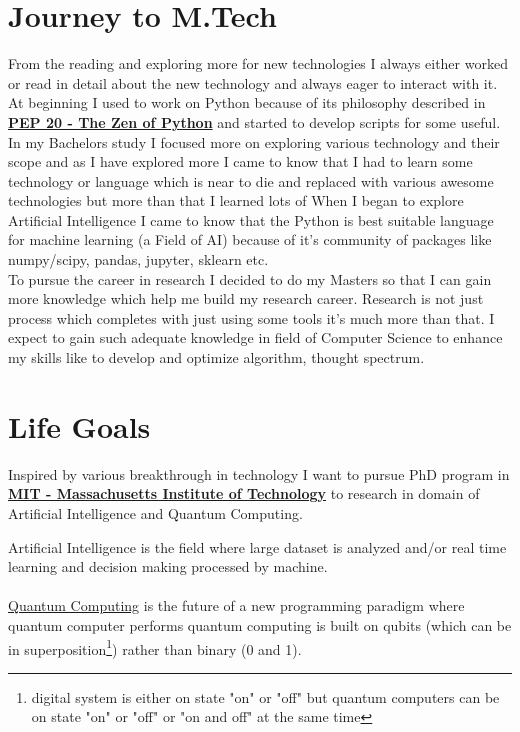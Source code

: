 \documentclass[a4paper, 14pt]{article}
\begin{document}
	\newpage
	\section*{Journey to M.Tech}
	From the reading and exploring more for new technologies I always either worked or read in detail about the new technology and always eager to interact with it. \\

	At beginning I used to work on Python because of its philosophy described in \href{https://www.python.org/dev/peps/pep-0020/#the-zen-of-python}{\textbf{PEP 20 -  The Zen of Python}} and started to develop scripts for some useful. \\
	In my Bachelors study I focused more on exploring various technology and their scope and as I have explored more I came to know that I had to learn some technology or language which is near to die and replaced with various awesome technologies but more than that I learned lots of 
	When I began to explore Artificial Intelligence I came to know that the Python is best suitable language for machine learning (a Field of AI) because of it's community of packages like numpy/scipy, pandas, jupyter, sklearn etc. \\
	
	To pursue the career in research I decided to do my Masters so that I can gain more knowledge which help me build my research career. Research is not just  process which completes with just using some tools it's much more than that. I expect to gain such adequate knowledge in field of Computer Science to enhance my skills like to develop and optimize algorithm, thought spectrum.

	\section*{Life Goals}
	Inspired by various breakthrough in technology I want to pursue PhD program in  \href{http://www.mit.edu/about/}{\textbf{MIT - Massachusetts Institute of Technology}} to research in domain of Artificial Intelligence and Quantum Computing.
	
	Artificial Intelligence is the field where large dataset is analyzed and/or real time learning and decision making processed by machine. \\
	\\
	\href{https://en.wikipedia.org/wiki/Quantum_computing}{Quantum Computing} is the future of a new programming paradigm where quantum computer performs quantum computing is built on qubits (which can be in superposition\footnote{digital system is either on state "on" or "off" but quantum computers can be on state "on" or "off" or "on and off" at the same time}) rather than binary (0 and 1). 
\end{document}
